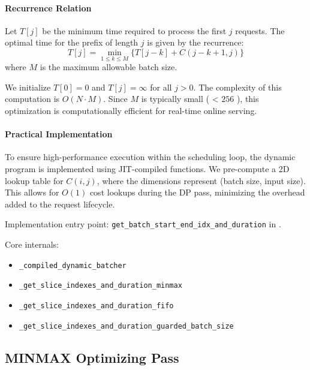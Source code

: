 \documentclass{article}
\providecommand{\tightlist}{\setlength{\itemsep}{0pt}\setlength{\parskip}{0pt}}
\begin{document}
\hypertarget{recurrence-relation}{%
\paragraph{Recurrence Relation}\label{recurrence-relation}}

Let \(T[j]\) be the minimum time required to process the first \(j\)
requests. The optimal time for the prefix of length \(j\) is given by
the recurrence:
\[T[j] = \min_{1 \le k \le M} \{ T[j - k] + C(j - k + 1, j) \}\] where
\(M\) is the maximum allowable batch size.

We initialize \(T[0] = 0\) and \(T[j] = \infty\) for all \(j > 0\). The
complexity of this computation is \(O(N \cdot M)\). Since \(M\) is
typically small ( \textless{} \(256\) ), this optimization is
computationally efficient for real-time online serving.

\hypertarget{practical-implementation}{%
\paragraph{Practical Implementation}\label{practical-implementation}}

To ensure high-performance execution within the scheduling loop, the
dynamic program is implemented using JIT-compiled functions. We
pre-compute a 2D lookup table for \(C(i, j)\), where the dimensions
represent (batch size, input size). This allows for \(O(1)\) cost
lookups during the DP pass, minimizing the overhead added to the request
lifecycle.

Implementation entry point:
\texttt{get\_batch\_start\_end\_idx\_and\_duration} in
.

Core internals:

\begin{itemize}
\tightlist
\item
  \texttt{\_compiled\_dynamic\_batcher}
\item
  \texttt{\_get\_slice\_indexes\_and\_duration\_minmax}
\item
  \texttt{\_get\_slice\_indexes\_and\_duration\_fifo}
\item
  \texttt{\_get\_slice\_indexes\_and\_duration\_guarded\_batch\_size}
\end{itemize}

\hypertarget{42-minmax-optimizing-pass}{%
\subsection{MINMAX Optimizing
Pass}\label{42-minmax-optimizing-pass}}
\end{document}
